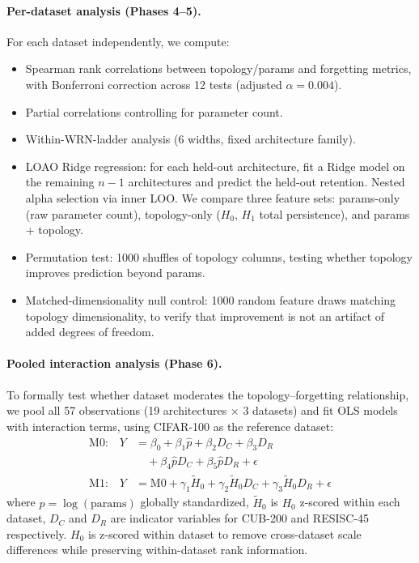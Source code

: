 \documentclass[10pt,twocolumn]{article}
\begin{document}
\paragraph{Per-dataset analysis (Phases 4--5).}
For each dataset independently, we compute:
\begin{itemize}
    \item Spearman rank correlations between topology/params and forgetting metrics, with Bonferroni correction across 12 tests (adjusted $\alpha = 0.004$).
    \item Partial correlations controlling for parameter count.
    \item Within-WRN-ladder analysis (6 widths, fixed architecture family).
    \item LOAO Ridge regression: for each held-out architecture, fit a Ridge model on the remaining $n - 1$ architectures and predict the held-out retention. Nested alpha selection via inner LOO. We compare three feature sets: params-only (raw parameter count), topology-only ($H_0$, $H_1$ total persistence), and params + topology.
    \item Permutation test: 1000 shuffles of topology columns, testing whether topology improves prediction beyond params.
    \item Matched-dimensionality null control: 1000 random feature draws matching topology dimensionality, to verify that improvement is not an artifact of added degrees of freedom.
\end{itemize}

\paragraph{Pooled interaction analysis (Phase 6).}
To formally test whether dataset moderates the topology--forgetting relationship, we pool all 57 observations (19 architectures $\times$ 3 datasets) and fit OLS models with interaction terms, using CIFAR-100 as the reference dataset:
\begin{align}
    \text{M0:}\quad Y &= \beta_0 + \beta_1 \hat{p} + \beta_2 D_C + \beta_3 D_R \nonumber \\
    &\quad + \beta_4 \hat{p} D_C + \beta_5 \hat{p} D_R + \epsilon \label{eq:m0} \\[4pt]
    \text{M1:}\quad Y &= \text{M0} + \gamma_1 \tilde{H}_0 + \gamma_2 \tilde{H}_0 D_C + \gamma_3 \tilde{H}_0 D_R + \epsilon \label{eq:m1}
\end{align}
where $\hat{p} = \log(\text{params})$ globally standardized, $\tilde{H}_0$ is $H_0$ z-scored within each dataset, $D_C$ and $D_R$ are indicator variables for CUB-200 and RESISC-45 respectively. $H_0$ is z-scored within dataset to remove cross-dataset scale differences while preserving within-dataset rank information.
\end{document}
